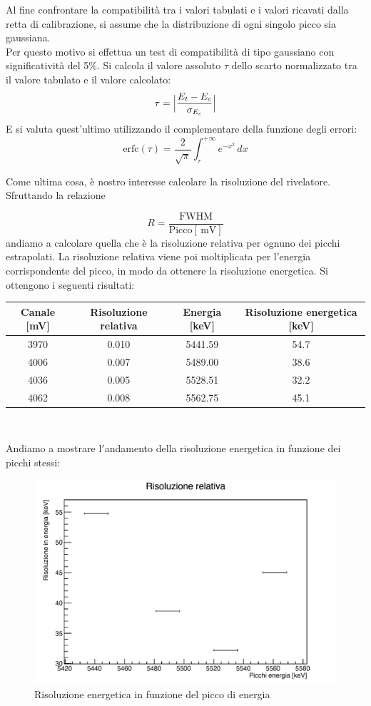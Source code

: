 \documentclass[a4paper,10pt]{article}
\newcommand*{\unit}[1]{\ensuremath{\mathrm{\,#1}}}
\begin{document}
\noindent Al fine confrontare la compatibilit\`a tra i valori tabulati e i valori ricavati dalla retta di calibrazione, si assume che la distribuzione di ogni singolo picco sia gaussiana.\\
Per questo motivo si effettua un test di compatibilit\`a di tipo gaussiano con significativit\`a del 5\%.
Si calcola il valore assoluto $\tau$ dello scarto normalizzato tra il valore tabulato e il valore calcolato:
$$
    \tau = \abs\Big{\frac{E_t - E_c}{\sigma_{E_c}}}
$$
E si valuta quest'ultimo utilizzando il complementare della funzione degli errori:
$$
    \textrm{erfc} (\tau) = \frac{2}{\sqrt{\pi}}\int_{\tau}^{+\infty} e^{-x^2}\, dx
$$

\noindent Come ultima cosa, \`e nostro interesse calcolare la risoluzione del rivelatore. Sfruttando la relazione

$$
    R=\frac{\textrm{FWHM}}{\textrm{Picco}[\unit{mV}]}
$$
andiamo a calcolare quella che \`e la risoluzione relativa per ognuno dei picchi estrapolati. La risoluzione relativa viene poi moltiplicata per l'energia corrispondente del picco, in modo da ottenere la risoluzione energetica. Si ottengono i seguenti risultati:

\begin{center}
    \begin{tabular}{cccc}
        \toprule
        Canale [mV] & Risoluzione relativa & Energia [keV] & Risoluzione energetica [keV] \\
        \midrule
        3970 & 0.010 & 5441.59 & 54.7\\
        4006 & 0.007 & 5489.00 & 38.6\\
        4036 & 0.005 & 5528.51 & 32.2\\
        4062 & 0.008 & 5562.75 & 45.1\\
        \bottomrule
    \end{tabular}\\
\end{center}

\noindent Andiamo a mostrare l$'$andamento della risoluzione energetica in funzione dei picchi stessi:

\begin{figure}[H]
    \centering
    \includegraphics[scale=0.45]{grafici/risoluzione}
    \caption{Risoluzione energetica in funzione del picco di energia}
\end{figure}
\end{document}
